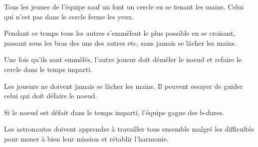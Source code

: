 \documentclass{grand-jeu}
\begin{document}
\begin{regles}
Tous les jeunes de l'équipe sauf un font un cercle en se tenant les mains. Celui qui n'est pas dans le cercle ferme les yeux. 

Pendant ce temps tous les autres s'emmêlent le plus possible en se croisant, passant sous les bras des uns des autres etc, sans jamais se lâcher les mains. 

Une fois qu'ils sont emmêlés, l'autre joueur doit démêler le noeud et refaire le cercle dans le temps imparti.

Les joueurs ne doivent jamais se lâcher les mains. Il peuvent essayer de guider celui qui doit défaire le noeud. 

Si le noeud est défait dans le temps imparti, l'équipe gagne des b-dures. 
\end{regles}

\begin{imaginaire}
Les astronautes doivent apprendre à travailler tous ensemble malgré les difficultés pour mener à bien leur mission et rétablir l'harmonie.
\end{imaginaire}

\begin{moments-stop}
\end{moments-stop}
\end{document}
